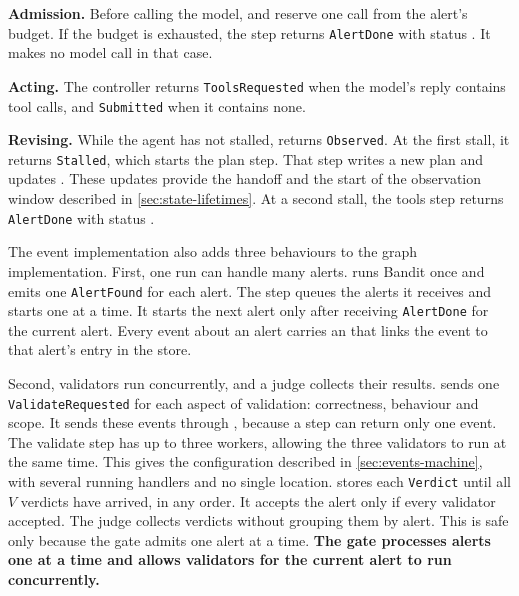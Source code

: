 \bi

\item \textbf{Admission.} Before calling the model,  and  reserve
one call from the alert's budget. If the budget is exhausted, the step returns \texttt{AlertDone}
with status . It makes no model call in that case.

\item \textbf{Acting.} The controller returns \texttt{ToolsRequested} when the model's reply
contains tool calls, and \texttt{Submitted} when it contains none.

\item \textbf{Revising.} While the agent has not stalled,  returns
\texttt{Observed}. At the first stall, it returns \texttt{Stalled}, which starts the plan step.
That step writes a new plan and updates . These updates provide the
handoff and the start of the observation window described in \cref{sec:state-lifetimes}. At a
second stall, the tools step returns \texttt{AlertDone} with status .

\ei

The event implementation also adds three behaviours to the graph implementation. First, one run
can handle many alerts.  runs Bandit once and emits one \texttt{AlertFound} for each
alert. The  step queues the alerts it receives and starts one at a time. It starts
the next alert only after receiving \texttt{AlertDone} for the current alert. Every event about
an alert carries an  that links the event to that alert's entry in the store.

Second, validators run concurrently, and a judge collects their results.  sends
one \texttt{ValidateRequested} for each aspect of validation: correctness, behaviour and scope.
It sends these events through , because a step can return only one
event. The validate step has up to three workers, allowing the three validators to run at the
same time. This gives the configuration described in \cref{sec:events-machine}, with several
running handlers and no single location.  stores each \texttt{Verdict} until all
$V$ verdicts have arrived, in any order. It accepts the alert only if every validator accepted.
The judge collects verdicts without grouping them by alert. This is safe only because the gate
admits one alert at a time. \textbf{The gate processes alerts one at a time and allows validators
for the current alert to run concurrently.}

